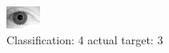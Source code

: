 \begin{figure}[h!]
\begin{center}
\includegraphics[width=0.60\columnwidth]{figures/ID2160_class_4_target_3.png}
\end{center}
\caption{ Classification: 4 actual target: 3}
\label{fig:ID2160_class_4_target_3}
\end{figure}
